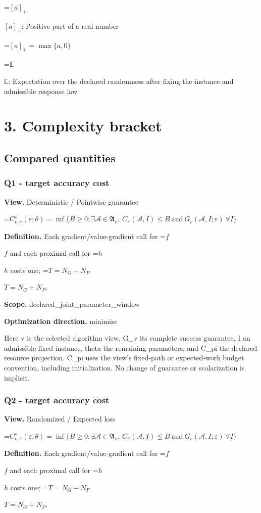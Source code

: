 \documentclass[10pt,a4paper]{article}
\newcommand{\AtlasMath}[1]{\par\begingroup\centering\setbox0=\hbox{$\displaystyle #1$}\ifdim\wd0>1.4\linewidth\typeout{ATLAS WIDE FORMULA: \the\wd0}\fi\ifdim\wd0>\linewidth\resizebox{\linewidth}{!}{\box0}\else\box0\fi\par\endgroup}
\newcommand{\AtlasInlineMath}[1]{\begingroup\setbox0=\hbox{$#1$}\ifdim\wd0>.4\linewidth\endgroup\AtlasMath{#1}\else\endgroup$#1$\fi}
\begin{document}
\AtlasInlineMath{[a]_+}: Positive part of a real number


\AtlasMath{[a]_+=\max\{a,0\}}


\AtlasInlineMath{\mathbb{E}}: Expectation over the declared randomness after fixing the instance and admissible response law

\section{3. Complexity bracket}
\subsection{Compared quantities}
\subsubsection{Q1 - target accuracy cost}
\textbf{View.} Deterministic / Pointwise guarantee

\AtlasMath{C^\star_{v,\pi}(\varepsilon;\theta)=\inf\{B\ge0:\exists\mathcal A\in\mathfrak A_v,\ C_\pi(\mathcal A,I)\le B\ \text{and}\ G_v(\mathcal A,I;\varepsilon)\ \forall I\}}
\textbf{Definition.} Each gradient/value-gradient call for \AtlasInlineMath{f} and each proximal call for \AtlasInlineMath{h} costs one; \AtlasInlineMath{T=N_G+N_P}.

\textbf{Scope.} declared\_joint\_parameter\_window

\textbf{Optimization direction.} minimize

Here v is the selected algorithm view, G\_v its complete success guarantee, I an admissible fixed instance, theta the remaining parameters, and C\_pi the declared resource projection. C\_pi uses the view's fixed-path or expected-work budget convention, including initialization. No change of guarantee or scalarization is implicit.

\subsubsection{Q2 - target accuracy cost}
\textbf{View.} Randomized / Expected loss

\AtlasMath{C^\star_{v,\pi}(\varepsilon;\theta)=\inf\{B\ge0:\exists\mathcal A\in\mathfrak A_v,\ C_\pi(\mathcal A,I)\le B\ \text{and}\ G_v(\mathcal A,I;\varepsilon)\ \forall I\}}
\textbf{Definition.} Each gradient/value-gradient call for \AtlasInlineMath{f} and each proximal call for \AtlasInlineMath{h} costs one; \AtlasInlineMath{T=N_G+N_P}.
\end{document}

